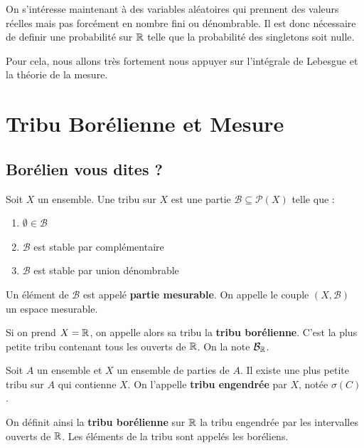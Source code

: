 

On s'intéresse maintenant à des variables aléatoires qui prennent des valeurs réelles mais pas forcément en nombre fini ou dénombrable.
Il est donc nécessaire de definir une probabilité sur $\mathbb{R}$ telle que la probabilité des singletons soit nulle.

Pour cela, nous allons très fortement nous appuyer sur l'intégrale de Lebesgue et la théorie de la mesure. 


\section{Tribu Borélienne et Mesure}

\subsection{Borélien vous dites ?}

\begin{definition}[Tribu]
    Soit $X$ un ensemble. Une tribu sur $X$ est une partie $ \mathcal{B} \subseteq \mathcal{P}(X)$ telle que :
    \begin{enumerate}[label=\roman*)]
        \item $\emptyset \in \mathcal{B}$ 
        \item $ \mathcal{B}$ est stable par complémentaire 
        \item $ \mathcal{B}$ est stable par union dénombrable
    \end{enumerate}
    Un élément de $ \mathcal{B}$ est appelé \textbf{partie mesurable}. 
    On appelle le couple $(X, \mathcal{B})$ un espace mesurable. 
\end{definition}

\begin{remark}
    Si on prend $X = \mathbb{R}$, on appelle alors sa tribu la \textbf{tribu borélienne}. 
    C'est la plus petite tribu contenant tous les ouverts de $\mathbb{R}$. 
    On la note $ \mathcal{B}_{\mathbb{R}}$. 
\end{remark}

\begin{proposition}
    Soit $A$ un ensemble et $X$ un ensemble de parties de $A$. Il existe une plus petite tribu sur 
    $A$ qui contienne $X$. On l'appelle \textbf{tribu engendrée} par $X$, notée $\sigma (C)$.

    On définit ainsi la \textbf{tribu borélienne} sur $\mathbb{R}$ la tribu engendrée par les intervalles ouverts de $\mathbb{R}$. 
    Les éléments de la tribu sont appelés les boréliens.
\end{proposition}

